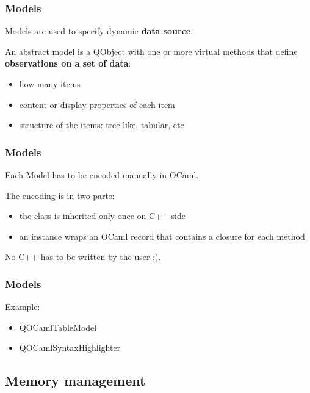 \documentclass[serif,mathserif]{beamer}
\begin{document}
\begin{frame}
  \frametitle{Models}

  Models are used to specify dynamic {\bf data source}.

  \medskip

  An abstract model is a QObject with one or more virtual methods that define
  {\bf observations on a set of data}:

  \begin{itemize}
    \item how many items
    \item content or display properties of each item
    \item structure of the items: tree-like, tabular, etc
  \end{itemize}

\end{frame}

\begin{frame}
  \frametitle{Models}

  Each Model has to be encoded manually in OCaml.

  The encoding is in two parts:

  \begin{itemize}
    \item the class is inherited only once on C++ side
    \item an instance wraps an OCaml record that contains a closure for each method
  \end{itemize}

  No C++ has to be written by the user :).

\end{frame}


\begin{frame}
  \frametitle{Models}

  Example: 
  \begin{itemize}
    \item QOCamlTableModel
    \item QOCamlSyntaxHighlighter
  \end{itemize}

\end{frame}

\subsection{Memory management}
\end{document}
